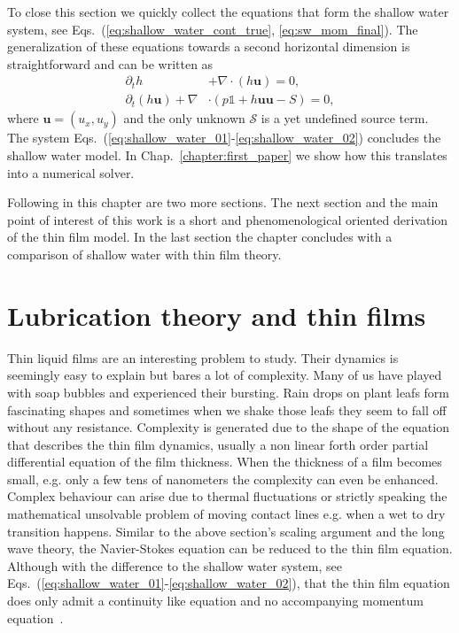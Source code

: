 To close this section we quickly collect the equations that form the shallow water system, see Eqs.~(\ref{eq:shallow_water_cont_true}, \ref{eq:sw_mom_final}).
The generalization of these equations towards a second horizontal dimension is straightforward and can be written as~\cite{salmonLatticeBoltzmannMethod1999, dellarNonhydrodynamicModesPriori2002, thommesLatticeBoltzmannMethods2007}
\begin{align}    
        \partial_t h &+ \nabla \cdot (h\mathbf{u}) = 0, \label{eq:shallow_water_01}\\
        \partial_t (h\mathbf{u}) + \nabla&\cdot (p \mathbb{1} + h\mathbf{u}\mathbf{u} - S) = 0, \label{eq:shallow_water_02} 
\end{align}
where $\mathbf{u} = (u_x, u_y)$ and the only unknown $\mathcal{S}$ is a yet undefined source term. 
The system Eqs.~(\ref{eq:shallow_water_01}-\ref{eq:shallow_water_02}) concludes the shallow water model. 
In Chap.~\ref{chapter:first_paper} we show how this translates into a numerical solver.

Following in this chapter are two more sections.
The next section and the main point of interest of this work is a short and phenomenological oriented derivation of the thin film model.
In the last section the chapter concludes with a comparison of shallow water with thin film theory.

\section{Lubrication theory and thin films}
\label{sec:thin_films}
Thin liquid films are an interesting problem to study.
Their dynamics is seemingly easy to explain but bares a lot of complexity.
Many of us have played with soap bubbles and experienced their bursting. 
Rain drops on plant leafs form fascinating shapes and sometimes when we shake those leafs they seem to fall off without any resistance. 
Complexity is generated due to the shape of the equation that describes the thin film dynamics, usually a non linear forth order partial differential equation of the film thickness.
When the thickness of a film becomes small, e.g. only a few tens of nanometers the complexity can even be enhanced. 
Complex behaviour can arise due to thermal fluctuations or strictly speaking the mathematical unsolvable problem of moving contact lines e.g. when a wet to dry transition happens.
Similar to the above section's scaling argument and the long wave theory, the Navier-Stokes equation can be reduced to the thin film equation. 
Although with the difference to the shallow water system, see Eqs.~(\ref{eq:shallow_water_01}-\ref{eq:shallow_water_02}), that the thin film equation does only admit a continuity like equation and no accompanying momentum equation~\cite{oronLongscaleEvolutionThin1997, degennesWettingStaticsDynamics1985, crasterDynamicsStabilityThin2009}.

